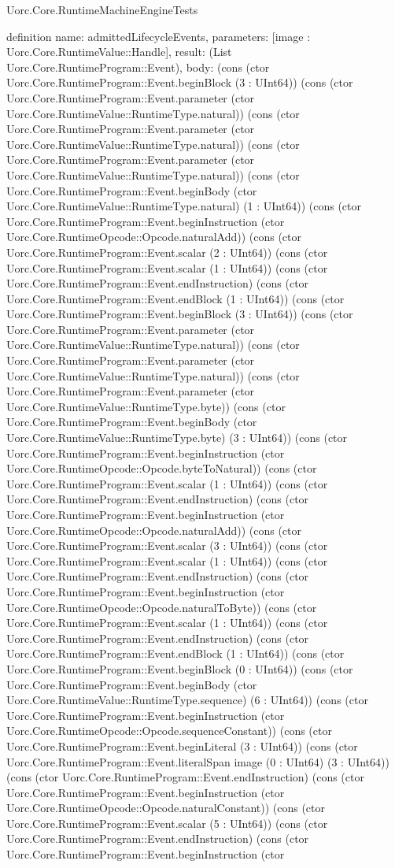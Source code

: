 \begin{lexlean}{Uorc.Core.RuntimeMachineEngineTests}
\begin{semanticmodule}
definition{
  name: admittedLifecycleEvents,
  parameters: [image : Uorc.Core.RuntimeValue::Handle],
  result: (List Uorc.Core.RuntimeProgram::Event),
  body: (cons (ctor Uorc.Core.RuntimeProgram::Event.beginBlock (3 : UInt64)) (cons (ctor Uorc.Core.RuntimeProgram::Event.parameter (ctor Uorc.Core.RuntimeValue::RuntimeType.natural)) (cons (ctor Uorc.Core.RuntimeProgram::Event.parameter (ctor Uorc.Core.RuntimeValue::RuntimeType.natural)) (cons (ctor Uorc.Core.RuntimeProgram::Event.parameter (ctor Uorc.Core.RuntimeValue::RuntimeType.natural)) (cons (ctor Uorc.Core.RuntimeProgram::Event.beginBody (ctor Uorc.Core.RuntimeValue::RuntimeType.natural) (1 : UInt64)) (cons (ctor Uorc.Core.RuntimeProgram::Event.beginInstruction (ctor Uorc.Core.RuntimeOpcode::Opcode.naturalAdd)) (cons (ctor Uorc.Core.RuntimeProgram::Event.scalar (2 : UInt64)) (cons (ctor Uorc.Core.RuntimeProgram::Event.scalar (1 : UInt64)) (cons (ctor Uorc.Core.RuntimeProgram::Event.endInstruction) (cons (ctor Uorc.Core.RuntimeProgram::Event.endBlock (1 : UInt64)) (cons (ctor Uorc.Core.RuntimeProgram::Event.beginBlock (3 : UInt64)) (cons (ctor Uorc.Core.RuntimeProgram::Event.parameter (ctor Uorc.Core.RuntimeValue::RuntimeType.natural)) (cons (ctor Uorc.Core.RuntimeProgram::Event.parameter (ctor Uorc.Core.RuntimeValue::RuntimeType.natural)) (cons (ctor Uorc.Core.RuntimeProgram::Event.parameter (ctor Uorc.Core.RuntimeValue::RuntimeType.byte)) (cons (ctor Uorc.Core.RuntimeProgram::Event.beginBody (ctor Uorc.Core.RuntimeValue::RuntimeType.byte) (3 : UInt64)) (cons (ctor Uorc.Core.RuntimeProgram::Event.beginInstruction (ctor Uorc.Core.RuntimeOpcode::Opcode.byteToNatural)) (cons (ctor Uorc.Core.RuntimeProgram::Event.scalar (1 : UInt64)) (cons (ctor Uorc.Core.RuntimeProgram::Event.endInstruction) (cons (ctor Uorc.Core.RuntimeProgram::Event.beginInstruction (ctor Uorc.Core.RuntimeOpcode::Opcode.naturalAdd)) (cons (ctor Uorc.Core.RuntimeProgram::Event.scalar (3 : UInt64)) (cons (ctor Uorc.Core.RuntimeProgram::Event.scalar (1 : UInt64)) (cons (ctor Uorc.Core.RuntimeProgram::Event.endInstruction) (cons (ctor Uorc.Core.RuntimeProgram::Event.beginInstruction (ctor Uorc.Core.RuntimeOpcode::Opcode.naturalToByte)) (cons (ctor Uorc.Core.RuntimeProgram::Event.scalar (1 : UInt64)) (cons (ctor Uorc.Core.RuntimeProgram::Event.endInstruction) (cons (ctor Uorc.Core.RuntimeProgram::Event.endBlock (1 : UInt64)) (cons (ctor Uorc.Core.RuntimeProgram::Event.beginBlock (0 : UInt64)) (cons (ctor Uorc.Core.RuntimeProgram::Event.beginBody (ctor Uorc.Core.RuntimeValue::RuntimeType.sequence) (6 : UInt64)) (cons (ctor Uorc.Core.RuntimeProgram::Event.beginInstruction (ctor Uorc.Core.RuntimeOpcode::Opcode.sequenceConstant)) (cons (ctor Uorc.Core.RuntimeProgram::Event.beginLiteral (3 : UInt64)) (cons (ctor Uorc.Core.RuntimeProgram::Event.literalSpan image (0 : UInt64) (3 : UInt64)) (cons (ctor Uorc.Core.RuntimeProgram::Event.endInstruction) (cons (ctor Uorc.Core.RuntimeProgram::Event.beginInstruction (ctor Uorc.Core.RuntimeOpcode::Opcode.naturalConstant)) (cons (ctor Uorc.Core.RuntimeProgram::Event.scalar (5 : UInt64)) (cons (ctor Uorc.Core.RuntimeProgram::Event.endInstruction) (cons (ctor Uorc.Core.RuntimeProgram::Event.beginInstruction (ctor }
\end{semanticmodule}
\end{lexlean}
